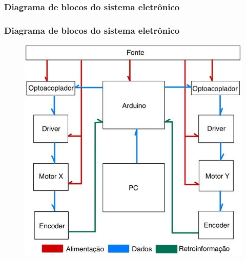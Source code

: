 \subsubsection{Diagrama de blocos do sistema eletrônico}

\begin{frame}
\frametitle{Diagrama de blocos do sistema eletrônico}

\begin{figure}
\centering
\includegraphics[scale = 0.30]{figuras/fluxogramaeletronico}
\end{figure}
    
\end{frame}
